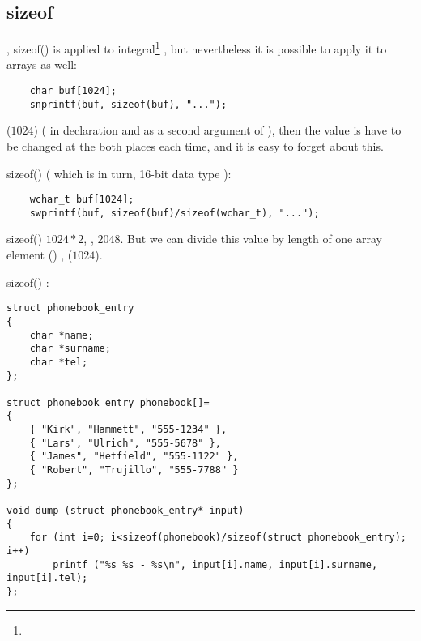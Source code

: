 ﻿\subsection{sizeof}

, sizeof() 
{is applied to integral}\footnote{}
,
{but nevertheless it is possible to apply it to arrays as well}:

\begin{lstlisting}
	char buf[1024];
	snprintf(buf, sizeof(buf), "...");
\end{lstlisting}

 ($1024$) 
(
{in  declaration and as a second argument of }),
{then the value is have to be changed at the both places each time, and it is easy to forget about this}.

 sizeof() 
  
(
{which is in turn, 16-bit data type }):

\begin{lstlisting}
	wchar_t buf[1024];
	swprintf(buf, sizeof(buf)/sizeof(wchar_t), "...");
\end{lstlisting}

sizeof()  $1024*2$, , $2048$. 
{But we can divide this value by length of one array element} ()
,
 ($1024$).

sizeof() :

\begin{lstlisting}
struct phonebook_entry
{
	char *name;
	char *surname;
	char *tel;
};

struct phonebook_entry phonebook[]=
{
	{ "Kirk", "Hammett", "555-1234" },
	{ "Lars", "Ulrich", "555-5678" },
	{ "James", "Hetfield", "555-1122" },
	{ "Robert", "Trujillo", "555-7788" }
};

void dump (struct phonebook_entry* input)
{
	for (int i=0; i<sizeof(phonebook)/sizeof(struct phonebook_entry); i++)
		printf ("%s %s - %s\n", input[i].name, input[i].surname, input[i].tel);
};
\end{lstlisting}

